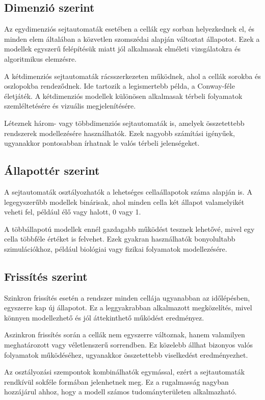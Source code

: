 \documentclass{thesis-ekf}
\begin{document}
\subsection{Dimenzió szerint}
Az egydimenziós sejtautomaták esetében a cellák egy sorban helyezkednek el, és minden elem általában a közvetlen szomszédai alapján változtat állapotot. Ezek a modellek egyszerű felépítésük miatt jól alkalmasak elméleti vizsgálatokra és algoritmikus elemzésre.

A kétdimenziós sejtautomaták rácsszerkezeten működnek, ahol a cellák sorokba és oszlopokba rendeződnek. Ide tartozik a legismertebb példa, a Conway-féle életjáték. A kétdimenziós modellek különösen alkalmasak térbeli folyamatok szemléltetésére és vizuális megjelenítésére.

Léteznek három- vagy többdimenziós sejtautomaták is, amelyek összetettebb rendszerek modellezésére használhatók. Ezek nagyobb számítási igényűek, ugyanakkor pontosabban írhatnak le valós térbeli jelenségeket.

\subsection{Állapottér szerint}
A sejtautomaták osztályozhatók a lehetséges cellaállapotok száma alapján is. A legegyszerűbb modellek binárisak, ahol minden cella két állapot valamelyikét veheti fel, például élő vagy halott, 0 vagy 1.

A többállapotú modellek ennél gazdagabb működést tesznek lehetővé, mivel egy cella többféle értéket is felvehet. Ezek gyakran használhatók bonyolultabb szimulációkhoz, például biológiai vagy fizikai folyamatok modellezésére.

\subsection{Frissítés szerint}
Szinkron frissítés esetén a rendszer minden cellája ugyanabban az időlépésben, egyszerre kap új állapotot. Ez a leggyakrabban alkalmazott megközelítés, mivel könnyen modellezhető és jól áttekinthető működést eredményez.

Aszinkron frissítés során a cellák nem egyszerre változnak, hanem valamilyen meghatározott vagy véletlenszerű sorrendben. Ez közelebb állhat bizonyos valós folyamatok működéséhez, ugyanakkor összetettebb viselkedést eredményezhet.

Az osztályozási szempontok kombinálhatók egymással, ezért a sejtautomaták rendkívül sokféle formában jelenhetnek meg. Ez a rugalmasság nagyban hozzájárul ahhoz, hogy a modell számos tudományterületen alkalmazható.
\end{document}
